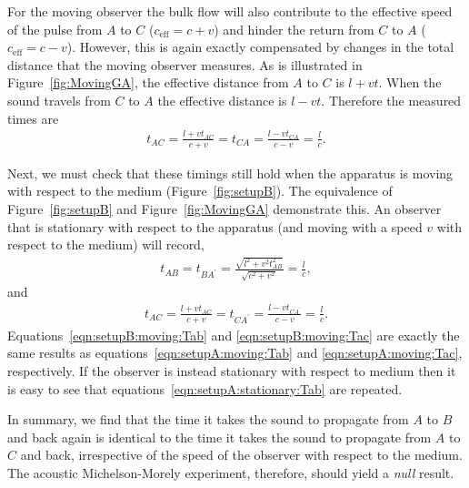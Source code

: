 \documentclass[10pt, fleqn,final,showtrims,oldfontcommands, article,a4paper,oneside]{memoir} %
\newcommand{\figref}[1]{Figure~\ref{fig:#1}}
\newcommand{\eff}{{\textrm{eff}}}
\begin{document}
For the moving observer the bulk flow will also contribute to the effective speed of the pulse from $A$ to $C$  ($c_\eff = c+v$) 
and hinder  the return from $C$ to $A$ ($c_\eff = c-v$).
However, this is again exactly compensated by changes in the total distance that the moving observer measures.
As is illustrated in \figref{MovingGA}, the effective distance from $A$ to $C$ is $l+vt$. %
When the sound travels from $C$ to $A$ the effective distance is $l-vt$. %
%
Therefore the measured times are
\begin{align}
  \label{eqn:setupA:moving:Tac}
  t_{AC} =  \frac{l+vt_{AC}}{c+v}= t_{CA} =  \frac{l-vt_{CA}}{c-v}= \frac{l}{c}.
\end{align}

Next, we must check that these timings still hold when the apparatus is moving with respect to the medium (\figref{setupB}).
The equivalence of \figref{setupB} and \figref{MovingGA} demonstrate this.
An observer that is stationary with respect to the apparatus (and moving with a speed $v$ with respect to the medium) will record,
\begin{align}
  \label{eqn:setupB:moving:Tab}
  t_{AB} = t_{BA^\prime} =  \frac{\sqrt{l^2+v^2t_{AB}^2}}{\sqrt{c^2 +v^2}} = \frac{l}{c},
\end{align}
and 
\begin{align}
  \label{eqn:setupB:moving:Tac}
  t_{AC} =  \frac{l+vt_{AC}}{c+v}= t_{CA^\prime} =  \frac{l-vt_{CA^\prime}}{c-v}= \frac{l}{c}.
\end{align}
Equations~\ref{eqn:setupB:moving:Tab} and \ref{eqn:setupB:moving:Tac}  are exactly the same results as equations~\ref{eqn:setupA:moving:Tab} and \ref{eqn:setupA:moving:Tac},
respectively.
If the observer is instead stationary with respect to medium then it is easy to see that equations~\ref{eqn:setupA:stationary:Tab}  are repeated.

In summary, we find that the time it takes the sound to propagate from $A$ to $B$ and back again is
identical to the time it takes the sound to propagate from $A$ to $C$ and back,
irrespective of the speed of the observer with respect to the medium.
The acoustic Michelson-Morely experiment, therefore, should yield a  {\em null} result.
\end{document}
